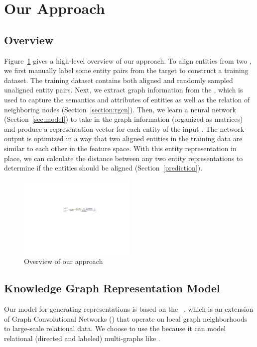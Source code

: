 \section{Our Approach}
	\label{section:app}

\subsection{Overview}
Figure~\ref{fig:overview} gives a high-level overview of our approach. To align entities from two \KGs, we first manually label some entity
pairs from the target \KGs to construct a training dataset. The training dataset contains both aligned and randomly sampled unaligned
entity pairs. Next, we extract graph information from the \KGs, which is used to capture the semantics and attributes of entities as well
as the relation of neighboring nodes (Section~\ref{section:rgcn}). Then, we learn a neural network (Section~\ref{sec:model}) to take in the
graph information (organized as matrices) and produce a representation vector for each entity of the input \KGs. The network output is
optimized in a way that two aligned entities in the training data are similar to each other in the feature space. With this entity
representation in place, we can calculate the distance between any two entity representations to determine if the entities should be
aligned (Section~\ref{prediction}).

\begin{figure}[t!]
  \centering
  \includegraphics[width=0.5\textwidth]{figures/overview.pdf}
  \caption{Overview of our approach}\label{fig:overview}
\end{figure}


	
    \subsection{Knowledge Graph Representation Model\label{sec:model}}
    Our model for generating \KG representations  is based on the \RGCN~\cite{Schlichtkrull2017Modeling}, which is an extension of Graph Convolutional Networks (\GCNs) that operate on local graph
neighborhoods~\cite{Duvenaud2015Convolutional,Kipf2016Semi} to large-scale relational data.
    We choose to use the \RGCN because it can model relational (directed and labeled) multi-graphs like \KGs.


